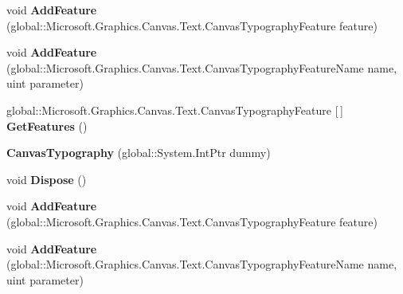 \begin{DoxyCompactItemize}
void {\bfseries Add\+Feature} (global\+::\+Microsoft.\+Graphics.\+Canvas.\+Text.\+Canvas\+Typography\+Feature feature)
\item 
\mbox{\label{class_microsoft_1_1_graphics_1_1_canvas_1_1_text_1_1_canvas_typography_ad4ae4dcdbdf7c24abf69746742cc3d0c}} 
void {\bfseries Add\+Feature} (global\+::\+Microsoft.\+Graphics.\+Canvas.\+Text.\+Canvas\+Typography\+Feature\+Name name, uint parameter)
\item 
\mbox{\label{class_microsoft_1_1_graphics_1_1_canvas_1_1_text_1_1_canvas_typography_a91ad523c9e09574205511271e56e706b}} 
global\+::\+Microsoft.\+Graphics.\+Canvas.\+Text.\+Canvas\+Typography\+Feature \mbox{[}$\,$\mbox{]} {\bfseries Get\+Features} ()
\item 
\mbox{\label{class_microsoft_1_1_graphics_1_1_canvas_1_1_text_1_1_canvas_typography_acfaa49a5331916c8f6730fa502fc9485}} 
{\bfseries Canvas\+Typography} (global\+::\+System.\+Int\+Ptr dummy)
\item 
\mbox{\label{class_microsoft_1_1_graphics_1_1_canvas_1_1_text_1_1_canvas_typography_a1797ea53a1672e4abdf3ca14d7a3d8da}} 
void {\bfseries Dispose} ()
\item 
\mbox{\label{class_microsoft_1_1_graphics_1_1_canvas_1_1_text_1_1_canvas_typography_adb24235074d7ba03317c093ee442f78d}} 
void {\bfseries Add\+Feature} (global\+::\+Microsoft.\+Graphics.\+Canvas.\+Text.\+Canvas\+Typography\+Feature feature)
\item 
\mbox{\label{class_microsoft_1_1_graphics_1_1_canvas_1_1_text_1_1_canvas_typography_ad4ae4dcdbdf7c24abf69746742cc3d0c}} 
void {\bfseries Add\+Feature} (global\+::\+Microsoft.\+Graphics.\+Canvas.\+Text.\+Canvas\+Typography\+Feature\+Name name, uint parameter)
\item 
\mbox{\label{class_microsoft_1_1_graphics_1_1_canvas_1_1_text_1_1_canvas_typography_a91ad523c9e09574205511271e56e706b}} 

\end{DoxyCompactItemize}
